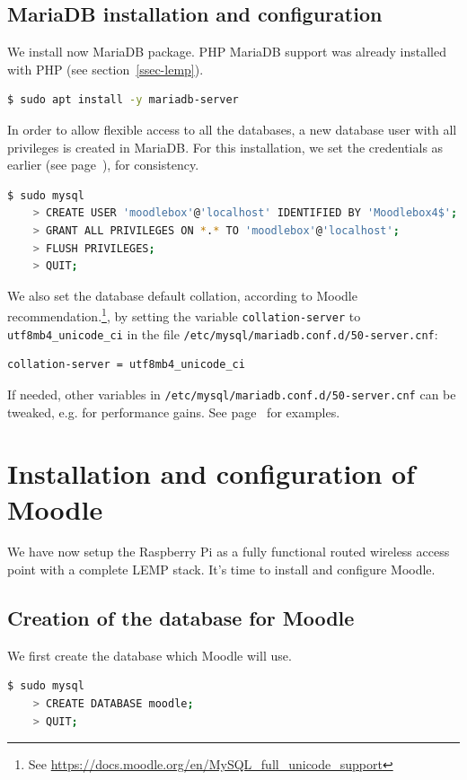 \documentclass[12pt]{article}
\begin{document}
\subsection{MariaDB installation and configuration}\label{ssec-mariadb}

We install now MariaDB package.
PHP MariaDB support was already installed with PHP (see section~\ref{ssec-lemp}).
\begin{lstlisting}[language=bash]
$ sudo apt install -y mariadb-server
\end{lstlisting}

In order to allow flexible access to all the databases, a new database user with all privileges is created in MariaDB.
For this installation, we set the credentials as earlier (see page~\pageref{page-credentials}), for consistency.

\begin{lstlisting}[language=bash]
$ sudo mysql
    > CREATE USER 'moodlebox'@'localhost' IDENTIFIED BY 'Moodlebox4$';
    > GRANT ALL PRIVILEGES ON *.* TO 'moodlebox'@'localhost';
    > FLUSH PRIVILEGES;
    > QUIT;
\end{lstlisting}
We also set the database default collation, according to Moodle recommendation.\footnote{See \url{https://docs.moodle.org/en/MySQL_full_unicode_support}}, by setting the variable \lstinline{collation-server} to \lstinline{utf8mb4_unicode_ci} in the file \lstinline{/etc/mysql/mariadb.conf.d/50-server.cnf}:
\begin{lstlisting}[language=bash]
collation-server = utf8mb4_unicode_ci
\end{lstlisting}
If needed, other variables in \lstinline{/etc/mysql/mariadb.conf.d/50-server.cnf} can be tweaked, e.g. for performance gains. See page~\pageref{ssec-mariadb-optimization} for examples.

\section{Installation and configuration of Moodle}

We have now setup the Raspberry Pi as a fully functional routed wireless access point with a complete LEMP stack.
It's time to install and configure Moodle.

\subsection{Creation of the database for Moodle}

We first create the database which Moodle will use.
\begin{lstlisting}[language=bash]
$ sudo mysql
    > CREATE DATABASE moodle;
    > QUIT;
\end{lstlisting}
\end{document}
